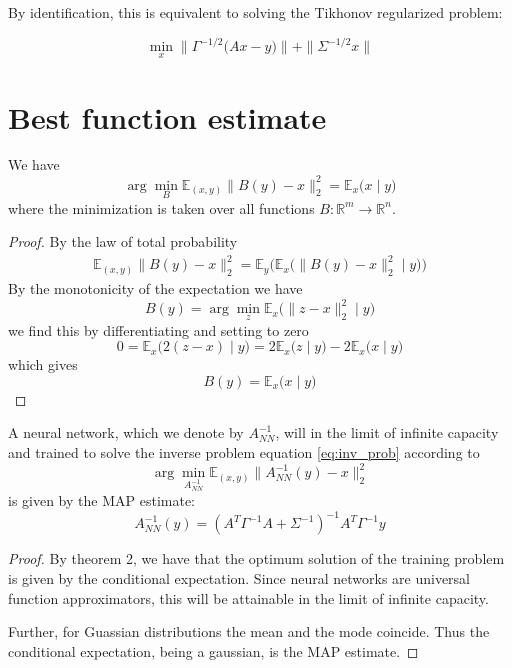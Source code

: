 \documentclass[a4paper,10pt]{article}
\begin{document}
	By identification, this is equivalent to solving the Tikhonov regularized problem:
	
	\[
		\min_x \| \Gamma^{-1/2} \bigl(Ax - y\bigr) \| + \|\Sigma^{-1/2} x\|
	\]
	
\section{Best function estimate}
\begin{theorem}[{\cite[\S\,1.5.5]{Bi2006}}]
  We have
	\[
		\arg \min_{B} \mathbb{E}_{(x, y)} \|B(y) - x\|_2^2 = \mathbb{E}_{x}\bigl(x \mid y \bigr)
	\]
	where the minimization is taken over all functions $B \colon \mathbb{R}^m \to \mathbb{R}^n$.
\end{theorem} 

	\begin{proof} By the law of total probability
	\begin{align*}
		\mathbb{E}_{(x, y)} \|B(y) - x\|_2^2 = 
		\mathbb{E}_{y} \bigl(\mathbb{E}_{x}\bigl(\|B(y) - x\|_2^2 \mid y \bigr)\bigr)
	\end{align*}
	By the monotonicity of the expectation we have
	\[
		B(y) = \arg\min_{z} \mathbb{E}_{x}\bigl(\|z - x\|_2^2 \mid y \bigr)
	\]
	we find this by differentiating and setting to zero
	\[
	    0 =
	    \mathbb{E}_{x}\bigl(2 (z - x) \mid y \bigr) =
	    2\mathbb{E}_{x}\bigl(z \mid y \bigr) - 2\mathbb{E}_{x}\bigl(x \mid y \bigr)
	\]
	which gives
	\[
		B(y) = \mathbb{E}_{x}\bigl(x \mid y \bigr)
	\]
\end{proof} 

	\begin{theorem} A neural network, which we denote by $A^{-1}_{NN}$, will in the limit of infinite capacity and trained to solve the inverse problem equation \ref{eq:inv_prob} according to
	\[
		\arg \min_{A^{-1}_{NN}} \mathbb{E}_{(x, y)} \|A^{-1}_{NN}(y) - x\|_2^2
	\]
	is given by the MAP estimate:
	\[
		A^{-1}_{NN}(y) = (A^T \Gamma^{-1} A + \Sigma^{-1})^{-1} A^T \Gamma^{-1} y
	\]
\end{theorem}

	\begin{proof} By theorem 2, we have that the optimum solution of the training problem is given by the conditional expectation. Since neural networks are universal function approximators, this will be attainable in the limit of infinite capacity.
	
	Further, for Guassian distributions the mean and the mode coincide. Thus the conditional expectation, being a gaussian, is the MAP estimate.
\end{proof}

  

\printbibliography%
	
\end{document}
